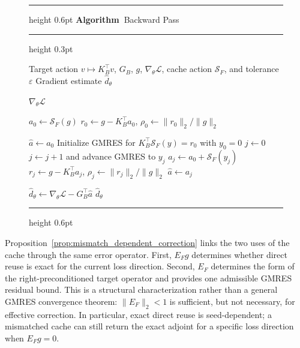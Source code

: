 \documentclass[letterpaper,10pt,conference]{ieeeconf}
\newcounter{dfalgorithm}
\renewcommand{\thedfalgorithm}{\arabic{dfalgorithm}}
\begin{document}
\begin{figure}[!t]
\vspace{2mm}
\begin{minipage}{\columnwidth}
\small
\raggedright
{}
\label{alg:factor_guided_backward}

\renewcommand{\algorithmicrequire}{\textbf{Input:}}
\renewcommand{\algorithmicensure}{\textbf{Output:}}

\hrule height 0.6pt
\vspace{3pt}
\noindent
\textbf{Algorithm~\thedfalgorithm}\quad Backward Pass\par
\vspace{3pt}
\hrule height 0.3pt
\vspace{2pt}

\begin{algorithmic}[1]
\setlength{\itemsep}{0.5pt}

\REQUIRE Target action $v\mapsto K_B^\top v$,
$G_B$, $g$, $\nabla_\theta\mathcal L$,
cache action $\mathcal S_F$, and tolerance $\varepsilon$
\ENSURE Gradient estimate $\widehat d_\theta$

    \RETURN $\nabla_\theta\mathcal L$
\ENDIF

\STATE $a_0\gets\mathcal S_F(g)$
\STATE $r_0\gets g-K_B^\top a_0$,
$\rho_0\gets\|r_0\|_2/\|g\|_2$

\IF{$\rho_0\leq\varepsilon$}
    \STATE $\widehat a\gets a_0$
\ELSE
    \STATE Initialize GMRES for
    $K_B^\top\mathcal S_F(y)=r_0$ with $y_0=0$
    \STATE $j\gets0$
        \STATE $j\gets j+1$ and advance GMRES to $y_j$
        \STATE $a_j\gets a_0+\mathcal S_F(y_j)$
        \STATE $r_j\gets g-K_B^\top a_j$,
        $\rho_j\gets\|r_j\|_2/\|g\|_2$
    \ENDWHILE
    \STATE $\widehat a\gets a_j$
\ENDIF

\STATE $\widehat d_\theta\gets
\nabla_\theta\mathcal L-G_B^\top\widehat a$
\RETURN $\widehat d_\theta$

\end{algorithmic}

\vspace{2pt}
\hrule height 0.6pt
\end{minipage}
\end{figure}

Proposition~\ref{prop:mismatch_dependent_correction} links the two uses
of the cache through the same error operator. First, $E_Fg$ determines
whether direct reuse is exact for the current loss direction. Second,
$E_F$ determines the form of the right-preconditioned target operator
and provides one admissible GMRES residual bound. This is a structural
characterization rather than a general GMRES convergence theorem:
$\|E_F\|_2<1$ is sufficient, but not necessary, for effective
correction. In particular, exact direct reuse is seed-dependent; a
mismatched cache can still return the exact adjoint for a specific loss
direction when $E_Fg=0$.
\end{document}
